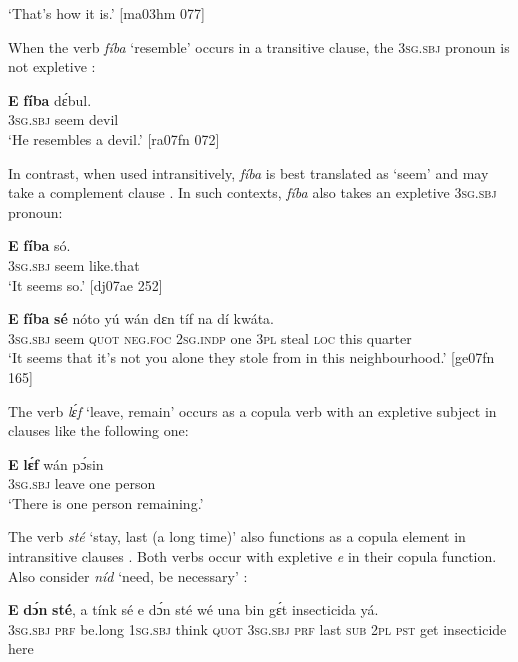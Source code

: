 \glt ‘That’s how it is.’ [ma03hm 077]
\z

When the verb \textit{fíba} ‘resemble’ occurs in a transitive clause, the \textsc{3sg.sbj} pronoun is not expletive : 


\ea%
    \label{ex:key:1140}
    \gll \textbf{E}    \textbf{fíba}    dɛ́bul.\\
\textsc{3sg.sbj}  seem  devil\\

\glt ‘He resembles a devil.’ [ra07fn 072]
\z

In contrast, when used intransitively, \textit{fíba} is best translated as ‘seem’  and may take a complement clause . In such contexts, \textit{fíba} also takes an expletive \textsc{3sg.sbj} pronoun:


\ea%
    \label{ex:key:1141}
    \gll \textbf{E}    \textbf{fíba}    só.\\
\textsc{3sg.sbj}  seem  like.that\\

\glt ‘It seems so.’ [dj07ae 252]
\z


\ea%
    \label{ex:key:1142}
    \gll \textbf{E}    \textbf{fíba}    \textbf{sé}    nóto  yú    wán    dɛn  tíf
na  dí  kwáta.\\
\textsc{3sg.sbj}  seem  \textsc{quot}    \textsc{neg}.\textsc{foc}  \textsc{2sg.indp}  one    \textsc{3pl}  steal
\textsc{loc}  this  quarter\\

\glt ‘It seems that it’s not you alone they stole from in this neighbourhood.’ [ge07fn 165]
\z

The verb \textit{lɛ́f} ‘leave, remain’ occurs as a copula verb with an expletive subject in clauses like the following one:


\ea%
    \label{ex:key:1143}
    \gll \textbf{E}    \textbf{lɛ́f}    wán    pɔ́sin\\
\textsc{3sg.sbj}  leave  one    person\\

\glt ‘There is one person remaining.’
\z

The verb \textit{sté} ‘stay, last (a long time)’ also functions as a copula element in intransitive clauses . Both verbs occur with expletive \textit{e} in their copula function. Also consider \textit{níd} ‘need, be necessary’ :


\ea%
    \label{ex:key:1144}
    \gll \textbf{E}    \textbf{dɔ́n}  \textbf{sté},    a    tínk    sé    e    dɔ́n  sté
wé  una  bin  gɛ́t  insecticida  yá.\\
\textsc{3sg.sbj}  \textsc{prf}  be.long  \textsc{1sg.sbj}  think  \textsc{quot}    \textsc{3sg.sbj}  \textsc{prf}  last
\textsc{sub}  \textsc{2pl}  \textsc{pst}  get  insecticide  here\\

